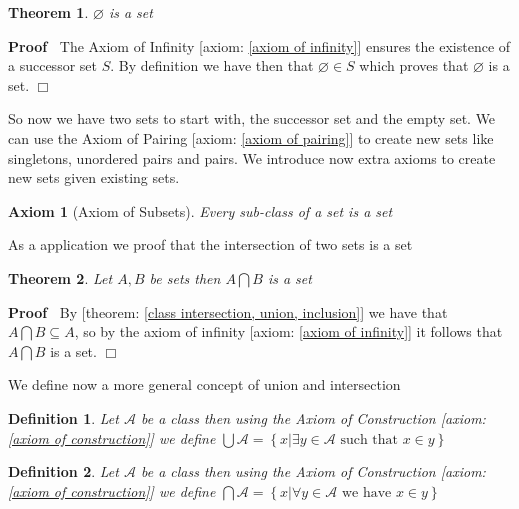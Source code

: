 \documentclass{book}
\newenvironment{proof}{\noindent\textbf{Proof\ }}{\hspace*{\fill}$\Box$\medskip}
\newtheorem{axiom}{Axiom}
{\theorembodyfont{\rmfamily}\newtheorem{convention}{Convention}}
\newtheorem{definition}{Definition}
{\theorembodyfont{\rmfamily}\newtheorem{example}{Example}}
\newtheorem{theorem}{Theorem}
\begin{document}
\begin{theorem}
  $\varnothing$ is a set
\end{theorem}

\begin{proof}
  The Axiom of Infinity [axiom: \ref{axiom of infinity}] ensures the existence
  of a successor set $S$. By definition we have then that $\varnothing \in S$
  which proves that $\varnothing$ is a set.
\end{proof}

So now we have two sets to start with, the successor set and the empty set. We
can use the Axiom of Pairing [axiom: \ref{axiom of pairing}] to create new
sets like singletons, unordered pairs and pairs. We introduce now extra axioms
to create new sets given existing sets.

\begin{axiom}[Axiom of Subsets]
  \label{axiom of subsets}{}Every sub-class of a set
  is a set
\end{axiom}

As a application we proof that the intersection of two sets is a set

\begin{theorem}
  \label{set intersection of two sets is aset}Let $A, B$ be sets then $A
  \bigcap B$ is a set
\end{theorem}

\begin{proof}
  By [theorem: \ref{class intersection, union, inclusion}] we have that $A
  \bigcap B \subseteq A$, so by the axiom of infinity [axiom: \ref{axiom of
  infinity}] it follows that $A \bigcap B$ is a set.
\end{proof}

We define now a more general concept of union and intersection

\begin{definition}
  \label{class union}Let $\mathcal{A}$ be a class then using the Axiom of
  Construction [axiom: \ref{axiom of construction}] we define $\bigcup
  \mathcal{A}= \left\{ x| \exists y \in \mathcal{A} \text{ such that } x \in y
  \right\}$
\end{definition}

\begin{definition}
  \label{class intersection}Let $\mathcal{A}$ be a class then using the Axiom
  of Construction [axiom: \ref{axiom of construction}] we define $\bigcap
  \mathcal{A}= \left\{ x| \forall y \in \mathcal{A} \text{ we have } x \in y
  \right\}$
\end{definition}
\end{document}
